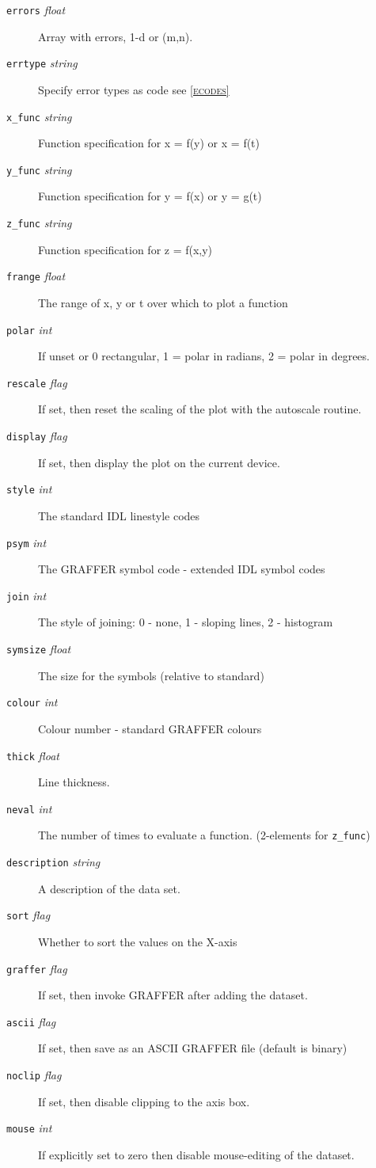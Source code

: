 \documentclass[11pt,twoside,english]{article}
\begin{document}
\begin{description}
\item[\texttt{errors} \textit{float}] Array with errors, 1-d or (m,n).
\item[\texttt{errtype} \textit{string}] Specify error types as code see
  \textsc{\autoref{ecodes}}
\item[\texttt{x\_func} \textit{string}] Function specification for x =
  f(y) or x = f(t)
\item[\texttt{y\_func} \textit{string}] Function specification for y =
  f(x) or y = g(t)
\item[\texttt{z\_func} \textit{string}] Function specification for z =
  f(x,y)
\item[\texttt{frange} \textit{float}] The range of x, y or t over which
  to plot a function
\item[\texttt{polar} \textit{int}] If unset or 0 rectangular, 1 = polar
  in radians, 2 = polar in degrees.
\item[\texttt{rescale} \textit{flag}] If set, then reset the scaling of
  the plot with the autoscale routine.
\item[\texttt{display} \textit{flag}] If set, then display the plot on
  the current device.
\item[\texttt{style} \textit{int}] The standard IDL linestyle codes
\item[\texttt{psym} \textit{int}] The GRAFFER symbol code - extended
  IDL symbol codes
\item[\texttt{join} \textit{int}] The style of joining: 0 - none, 1 -
  sloping lines, 2 - histogram
\item[\texttt{symsize} \textit{float}] The size for the symbols
  (relative to standard)
\item[\texttt{colour} \textit{int}] Colour number - standard GRAFFER
  colours
\item[\texttt{thick} \textit{float}] Line thickness.
\item[\texttt{neval} \textit{int}] The number of times to evaluate a
  function. (2-elements for \texttt{z\_func})
\item[\texttt{description} \textit{string}] A description of the data
  set.
\item[\texttt{sort} \textit{flag}] Whether to sort the values on the
  X-axis
\item[\texttt{graffer} \textit{flag}] If set, then invoke GRAFFER after
  adding the dataset.
\item[\texttt{ascii} \textit{flag}] If set, then save as an ASCII
  GRAFFER file (default is binary)
\item[\texttt{noclip} \textit{flag}] If set, then disable clipping to
  the axis box.
\item[\texttt{mouse} \textit{int}] If explicitly set to zero then
  disable mouse-editing of the dataset.


\end{description}
\end{document}
